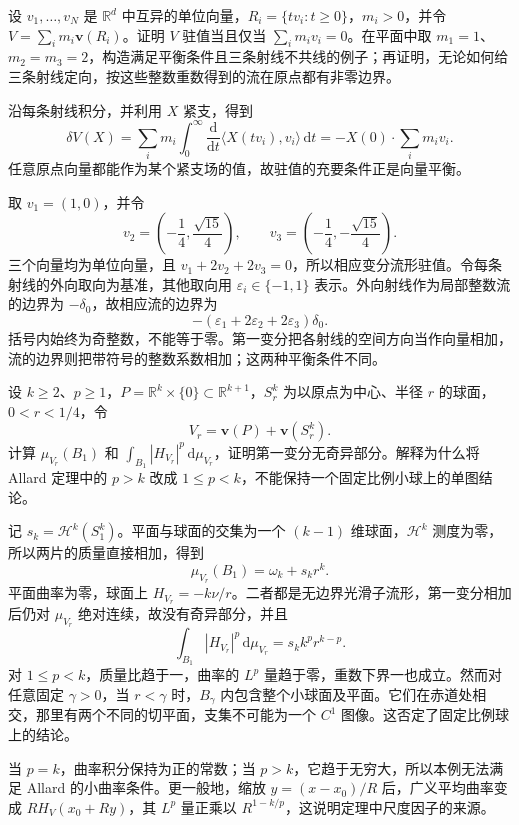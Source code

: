 \begin{optionalexercise}\label{g3:ex:varifold-junction-balance}
	设 \(v_1,\ldots,v_N\) 是 \(\mathbb R^d\) 中互异的单位向量，\(R_i=\{tv_i:t\ge0\}\)，\(m_i>0\)，并令 \(V=\sum_i m_i\mathbf v(R_i)\)。证明 \(V\) 驻值当且仅当 \(\sum_i m_iv_i=0\)。在平面中取 \(m_1=1\)、\(m_2=m_3=2\)，构造满足平衡条件且三条射线不共线的例子；再证明，无论如何给三条射线定向，按这些整数重数得到的流在原点都有非零边界。
\end{optionalexercise}
\begin{solution}
	沿每条射线积分，并利用 \(X\) 紧支，得到
	\[
		\delta V(X)=\sum_i m_i\int_0^\infty
		\frac{\mathrm d}{\mathrm dt}\langle X(tv_i),v_i\rangle\,\mathrm dt
		=-X(0)\cdot\sum_i m_iv_i.
	\]
	任意原点向量都能作为某个紧支场的值，故驻值的充要条件正是向量平衡。

	取 \(v_1=(1,0)\)，并令
	\[
		v_2=\left(-\frac14,\frac{\sqrt{15}}4\right),\qquad
		v_3=\left(-\frac14,-\frac{\sqrt{15}}4\right).
	\]
	三个向量均为单位向量，且 \(v_1+2v_2+2v_3=0\)，所以相应变分流形驻值。令每条射线的外向取向为基准，其他取向用 \(\varepsilon_i\in\{-1,1\}\) 表示。外向射线作为局部整数流的边界为 \(-\delta_0\)，故相应流的边界为
	\[
		-(\varepsilon_1+2\varepsilon_2+2\varepsilon_3)\delta_0.
	\]
	括号内始终为奇整数，不能等于零。第一变分把各射线的空间方向当作向量相加，流的边界则把带符号的整数系数相加；这两种平衡条件不同。
\end{solution}

\begin{optionalexercise}\label{g3:ex:allard-curvature-scaling}
	设 \(k\ge2\)、\(p\ge1\)，\(P=\mathbb R^k\times\{0\}\subset\mathbb R^{k+1}\)，\(S_r^k\) 为以原点为中心、半径 \(r\) 的球面，\(0<r<1/4\)，令
	\[
		V_r=\mathbf v(P)+\mathbf v(S_r^k).
	\]
	计算 \(\mu_{V_r}(B_1)\) 和 \(\int_{B_1}|H_{V_r}|^p\,\mathrm d\mu_{V_r}\)，证明第一变分无奇异部分。解释为什么将 Allard 定理中的 \(p>k\) 改成 \(1\le p<k\)，不能保持一个固定比例小球上的单图结论。
\end{optionalexercise}
\begin{solution}
	记 \(s_k=\mathcal H^k(S_1^k)\)。平面与球面的交集为一个 \((k-1)\) 维球面，\(\mathcal H^k\) 测度为零，所以两片的质量直接相加，得到
	\[
		\mu_{V_r}(B_1)=\omega_k+s_kr^k.
	\]
	平面曲率为零，球面上 \(H_{V_r}=-k\nu/r\)。二者都是无边界光滑子流形，第一变分相加后仍对 \(\mu_{V_r}\) 绝对连续，故没有奇异部分，并且
	\[
		\int_{B_1}|H_{V_r}|^p\,\mathrm d\mu_{V_r}
		=s_kk^p r^{k-p}.
	\]
	对 \(1\le p<k\)，质量比趋于一，曲率的 \(L^p\) 量趋于零，重数下界一也成立。然而对任意固定 \(\gamma>0\)，当 \(r<\gamma\) 时，\(B_\gamma\) 内包含整个小球面及平面。它们在赤道处相交，那里有两个不同的切平面，支集不可能为一个 \(C^1\) 图像。这否定了固定比例球上的结论。

	当 \(p=k\)，曲率积分保持为正的常数；当 \(p>k\)，它趋于无穷大，所以本例无法满足 Allard 的小曲率条件。更一般地，缩放 \(y=(x-x_0)/R\) 后，广义平均曲率变成 \(R H_V(x_0+Ry)\)，其 \(L^p\) 量正乘以 \(R^{1-k/p}\)，这说明定理中尺度因子的来源。
\end{solution}

